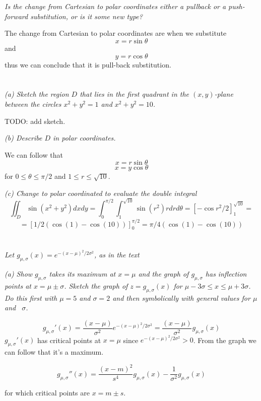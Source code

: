 \documentclass[11pt,oneside,titlepage]{book}
\begin{document}
\section{}

\textit{Is the change from Cartesian to polar coordinates either a pullback or a push-forward
  substitution, or is it some new type?}

The change from Cartesian to polar coordinates are when we substitute
$$x = r \sin\theta $$
and
$$y = r \cos \theta$$
thus we can conclude that it is pull-back substitution.

\section{}

\textit{(a) Sketch the region $D$ that lies in the first quadrant in the $(x,y)$-plane
  between the circles $x^2 + y^2 = 1$ and $x^2 + y^2 = 10$.}

TODO: add sketch.

\textit{(b) Describe $D$ in polar coordinates.}

We can follow that
$$x = r \sin \theta$$
$$x = y \cos \theta$$
for $0 \leq \theta \leq \pi/2$ and $1 \leq r \leq \sqrt{10}$.

\textit{(c) Change to polar coordinated to evaluate the double integral}
$$\iint_D{\sin{(x^2 + y^2)} dx dy}=
\int_0^{\pi/2}{\int_1^{\sqrt{10}}{\sin{(r^2)r dr}  d\theta}}= [-\cos{r^2}/2]_1^{\sqrt{10}} = $$
$$=  [1/2(\cos(1) - \cos(10))]_0^{\pi/2} = \pi/4(\cos(1) - \cos(10)) $$

\section{}

\textit{Let $g_{\mu, \sigma}(x) = e^{-(x - \mu)^2/2\sigma^2}$, as in the text}

\textit{(a) Show $g_{\mu, \sigma}$ takes its maximum  at $x = \mu$ and  the graph of
  $g_{\mu, \sigma}$ has inflection points at $x = \mu \pm \sigma$. Sketch the graph
  of $z = g_{\mu, \sigma}(x)$ for $\mu - 3 \sigma \leq x \leq \mu + 3\sigma$. Do this first
  with $\mu = 5$ and $\sigma = 2$ and then symbolically with general values for $\mu$ and \
  $\sigma$.}

$$g_{\mu, \sigma}'(x) = \frac{(x - \mu)}{\sigma^2} e^{-(x - \mu)^2/2\sigma^2} =
\frac{(x - \mu)}{\sigma^2} g_{\mu, \sigma}(x)$$
$g_{\mu, \sigma}'(x)$ has critical points at $x = \mu$ since $e^{-(x - \mu)^2/2\sigma^2} > 0$. From
the graph we can follow that it's a maximum.

$$g_{\mu, \sigma}''(x) = \frac{(x - m)^2}{s^4}g_{\mu, \sigma}(x) - \frac{1}{\sigma^2}g_{\mu, \sigma}(x)$$

for which critical points are $x = m \pm s$.
\end{document}
